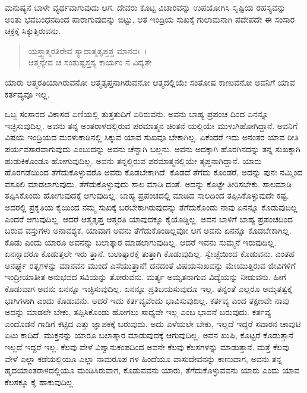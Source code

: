 ಮನುಷ್ಯನ ಬಾಳೇ ವ್ಯರ್ಥವಾಗುವುದು ಆಗ. ದೇವರು ಕೊಟ್ಟ ವಿಚಾರವನ್ನು ಉಪಯೋಗಿಸಿ ಸೃಷ್ಟಿಯ ರಹಸ್ಯವನ್ನು ಅರಿತು ಭವಬಂಧನದಿಂದ ಪಾರಾಗುವುದನ್ನು ಬಿಟ್ಟು, ಆತ ಇಂದ್ರಿಯ ಸುಖಕ್ಕೆ ಗುಲಾಮನಾಗಿ ಪದೇಪದೇ ಈ ಸಂಸಾರ ಚಕ್ರಕ್ಕೆ ಸಿಕ್ಕುತ್ತಿರುವನು.

\begin{verse}
ಯಸ್ತ್ವಾತ್ಮರತಿರೇವ ಸ್ಯಾದಾತ್ಮತೃಪ್ತಶ್ಚ ಮಾನವಃ~।\\ಆತ್ಮನ್ಯೇವ ಚ ಸಂತುಷ್ಟಸ್ತಸ್ಯ ಕಾರ್ಯಂ ನ ವಿದ್ಯತೇ 
\end{verse}

{\small ಯಾರು ಆತ್ಮರತಿಯಾಗಿರುವನೋ ಆತ್ಮತೃಪ್ತನಾಗಿರುವನೋ ಆತ್ಮದಲ್ಲಿಯೇ ಸಂತೋಷ ಕಾಣುವನೋ ಅವನಿಗೆ ಯಾವ ಕರ್ತವ್ಯವೂ ಇಲ್ಲ.}

ಒಬ್ಬ ಸಂಸಾರದ ವಿಕಾಸದ ಏಣಿಯಲ್ಲಿ ತುತ್ತತುದಿಗೆ ಏರಿರುವನು. ಅವನು ಬಾಹ್ಯ ಪ್ರಪಂಚ ದಿಂದ ಏನನ್ನೂ ಇಚ್ಛಿಸುವುದಿಲ್ಲ. ಅವನು ತನ್ನ ಅಂತರಾಳದಲ್ಲಿರುವ ಪರಮಾತ್ಮನ ಚಿಂತನೆ ಯಲ್ಲಿಯೇ ಮುಳುಗಿಹೋಗಿದ್ದಾನೆ. ಅವನಿಗೆ ವಿಷಯ ಇಂದ್ರಿಯದ ಮರಳುಕಾಡಿನಲ್ಲಿ ಸಿಕ್ಕುವ ಯಾವ ಸುಖವೂ ಬೇಕಾಗಿಲ್ಲ. ಏಕೆಂದರೆ ಇದು ಅನಂತರ ಯಾವ ರೀತಿ ಪರ್ಯವಸಾರವಾಗುವುದು ಎಂಬುದನ್ನು ಅವನು ಚೆನ್ನಾಗಿ ಬಲ್ಲನು. ಅವನು ಅದಕ್ಕಾಗಿ ಹೊರಗಿನದನ್ನು ತನ್ನ ಸುಖಕ್ಕಾಗಿ ಹುಡುಕಿಕೊಂಡೂ ಹೋಗುವುದಿಲ್ಲ. ಅವನು ತನ್ನಲ್ಲಿರುವ ಪರಮಾತ್ಮನಲ್ಲಿಯೇ ತೃಪ್ತನಾಗಿದ್ದಾನೆ. ಯಾರು ಹೊರಗಡೆಯಿಂದ ತೆಗೆದುಕೊಳ್ಳುವರೊ ಅವರು ಕೊಡಬೇಕಾಗಿದೆ. ಕೊಡದೆ ತೆಗೆದು ಕೊಂಡರೆ, ಅದನ್ನು ಪುನಃ ನಮ್ಮಿಂದ ವಸೂಲಿ ಮಾಡಲಾಗುವುದು. ತೆಗೆದುಕೊಳ್ಳುವುದು ಸಾಲ ಮಾಡಿ ದಂತೆ. ಅದನ್ನು ಕೊಟ್ಟೇ ತೀರಿಸಬೇಕು. ಸಾಲಮಾಡಿ ತಪ್ಪಿಸಿಕೊಂಡು ಹೋಗುವುದಕ್ಕೆ ಆಗುವುದಿಲ್ಲ. ಬಾಹ್ಯ ಪ್ರಪಂಚದಲ್ಲಿ ಮಾಡಿದ ಸಾಲದಿಂದ ತಪ್ಪಿಸಿಕೊಳ್ಳುವುದೇ ಕಷ್ಟ. ಅದರಲ್ಲಿ ಪ್ರಕೃತಿಯ ಕೈಯಿಂದ ನಮ್ಮ ಸುಖಕ್ಕೆ ಬರಬೇಕಾಗಿರುವುದನ್ನು ತೆಗೆದುಕೊಂಡು ನಾವು ಏನನ್ನೂ ಕೊಡುವುದಿಲ್ಲ ಎಂದರೆ ಆಗುವುದಿಲ್ಲ. ಆದರೆ ಆತ್ಮತೃಪ್ತ ಆತ್ಮರತಿ ಯಾವುದಕ್ಕೂ ಕೈಯೊಡ್ಡಿಲ್ಲ. ಅವನ ಬಾಳಿಗೆ ಬಾಹ್ಯ ಪ್ರಪಂಚದಿಂದ ಬರುವ ವಸ್ತುಗಳು ಅನಾವಶ್ಯಕ. ಯಾವಾಗ ಅವನು ತೆಗೆದುಕೊಂಡಿಲ್ಲವೋ ಆಗ ಅವನು ಏನನ್ನೂ ಕೊಡಬೇಕಾಗಿಲ್ಲ. ಕೊಡು ಎಂದು ಯಾರೂ ಅವನನ್ನು ಬಲಾತ್ಕಾರ ಮಾಡಲಾಗುವುದಿಲ್ಲ. ಆದರೆ ಇವನು ಸುಮ್ಮನೆ ಇರುವುದಿಲ್ಲ. ಏನನ್ನಾದರೂ ಕೊಡುತ್ತಲೇ ಇರು ತ್ತಾನೆ. ಬಲಾತ್ಕಾರಕ್ಕೆ ತುತ್ತಾಗಿ ಕೊಡುವುದಿಲ್ಲ. ಸ್ವೇಚ್ಛೆಯಿಂದ ಕೊಡುವನು. ಎಂತಹ ಅನರ್ಘ್ಯ ರತ್ನಗಳನ್ನು ಮಾನವನ ಮುಂದೆ ಎಸೆಯುತ್ತಾನೆ! ದನದಂತೆ ವಿಷಯಸುಖವನ್ನು ಮೇಯುತ್ತಿರುವ ಜೀವಿಗಳಿಗೆ ಇಂದ್ರೀಯಾತೀತ ಅನುಭವದ ಸವಿಯನ್ನು ತೋರುವನು. ಮರ್ತ್ಯ ಅಮೃತನಾಗುವ ವಿದ್ಯೆಯನ್ನು ನೀಡುವನು. ಹೀಗೆ ಕೊಡುವಾಗ ಅವನು ಏನನ್ನೂ ಇಚ್ಛಿಸುವುದಿಲ್ಲ. ಏನನ್ನೂ ಪ್ರತಿಬಯಸುವುದೂ ಇಲ್ಲ. ತನ್ನಂತೆ ಎಲ್ಲರೂ ಅಮೃತತ್ವಕ್ಕೆ ಭಾಗಿಗಳಾಗಿ ಎಂದು ಕೊಡುವನು. ಆದರೆ ಇದು ಕರ್ತವ್ಯವೆಂದು ಭಾವಿಸುವುದಿಲ್ಲ. ಕರ್ತವ್ಯ ಎಂದ ತಕ್ಷಣವೇ ನಾವು ಅದನ್ನು ಮಾಡಲೇ ಬೇಕು, ತಪ್ಪಿಸಿಕೊಂಡು ಹೋಗಲು ಸಾಧ್ಯವೇ ಇಲ್ಲ ಎಂಬ ಭಾವನೆ ಬರುವುದು. ಕರ್ತವ್ಯ ಎಂದೊಡನೆ ಗಾಡಿಗೆ ಕಟ್ಟಿದ ಎತ್ತು ಜ್ಞಾಪಕಕ್ಕೆ ಬರುವುದು. ಅದು ಎಳೆಯಲೇ ಬೇಕು, ಇಲ್ಲದೆ ಇದ್ದರೆ ಸವಾರನ ಚಾವುಟಿ ಏಟು ಕಾದಿದೆ. ಮುಕ್ತನನ್ನು ಯಾರೂ ಬಲಾತ್ಕಾರ ಮಾಡುವುದಕ್ಕೆ ಆಗುವುದಿಲ್ಲ. ಅವನ ಖುಷಿ, ಕೊಟ್ಟರೆ ಕೊಡುತ್ತಾನೆ ಇಲ್ಲದೆ ಇದ್ದರೆ ಇಲ್ಲ. ಕೆಲವು ವೇಳೆ ವಿಶ್ವಾನುಕಂಪದಿಂದ ಅವನೇ ಕೆಲವು ಕೆಲಸಗಳನ್ನು ಮಾಡುತ್ತಾನೆ. ಮತ್ತೆ ಕೆಲವು ವೇಳೆ ಎಲ್ಲಾ ಕಡೆಯಲ್ಲಿಯೂ ಎಲ್ಲಾ ನಾಮರೂಪ ಗಳ ಹಿಂದೆಯೂ ವಾಸುದೇವನನ್ನು ಕಾಣುವಾಗ, ಅವನು ತನ್ನ ಹೃದಯಾಂತರಾಳದಲ್ಲಿಯೂ ಮಂಡಿಸಿರುವಾಗ, ಕೊಡುವವನು ಯಾರು, ತೆಗೆದುಕೊಳ್ಳುವವನು ಯಾರು ಎಂದು ಯಾವ ಕೆಲಸಕ್ಕೂ ಕೈ ಹಾಕುವುದಿಲ್ಲ.

